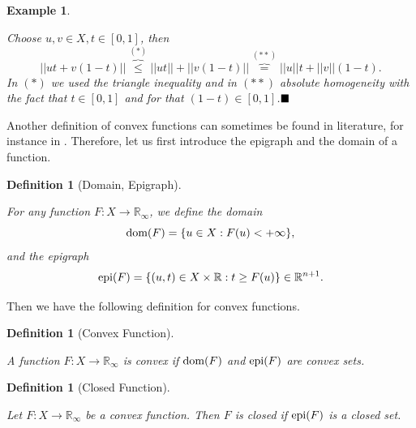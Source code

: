 \documentclass{scrreprt}
\newcommand{\qed}{$\hfill\blacksquare$}
\newtheorem{definition}[theorem]{Definition}
\newtheorem{example}[theorem]{Example}
\newenvironment{proof}[1][Proof]{\begin{trivlist}
\item[\hskip \labelsep {\bfseries #1}]}{\end{trivlist}}
\begin{document}
\begin{example}
\begin{enumerate}
                    \begin{proof} %
                        Choose $u, v \in X, t \in [0, 1]$, then
                        $$
                            ||ut + v(1 - t)|| \overbrace{\le}^{(\ast)} ||ut|| + ||v(1 - t)|| \overbrace{=}^{(\ast\ast)} ||u|| t + ||v|| (1 - t).
                        $$
                        In $(\ast)$ we used the triangle inequality and in $(\ast\ast)$ absolute homogeneity with the fact that $t \in [0, 1]$ and for that $(1-t) \in [0,1]$.\qed
                    \end{proof}
            \end{enumerate}

        \end{example}

        Another definition of convex functions can sometimes be found in literature, for instance in \cite{Rockafellar}. Therefore, let us first introduce the epigraph and the domain of a function.

        \begin{definition}[Domain, Epigraph] %
        \label{def:domain_epigraph}

            For any function $F: X \longrightarrow \mathbb{R}_{\infty}$, we define the domain
                $$
                    \textnormal{dom}(F) = \{ u \in X : F(u) < +\infty \},
                $$
            and the epigraph
                $$
                    \textnormal{epi}(F) = \{ (u, t) \in X \times \mathbb{R}: t \ge F(u) \} \in \mathbb{R}^{n+1}.
                $$
        \end{definition}

        Then we have the following definition for convex functions.

        \begin{definition}[Convex Function] %
        \label{def:convex_function_else}

            A function $F: X \longrightarrow \mathbb{R}_{\infty}$ is convex if $\textnormal{dom}(F)$ and $\textnormal{epi}(F)$ are convex sets.

        \end{definition}

        \begin{definition}[Closed Function] %
        \label{def:closed_function}

            Let $F: X \longrightarrow \mathbb{R}_{\infty}$ be a convex function. Then $F$ is closed if $\textnormal{epi}(F)$ is a closed set.

        \end{definition}
\end{document}
